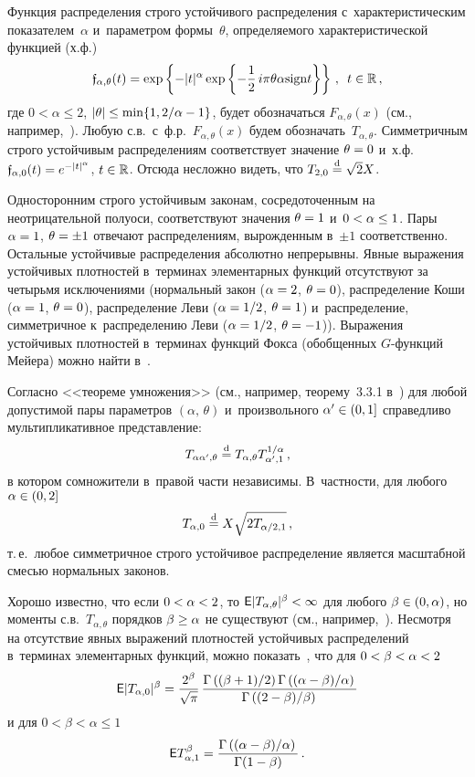 \begin{multicols}{2}
Функция распределения строго устойчивого распределения с~характеристическим
показателем~$\alpha$ и~параметром формы~$\theta$, определяемого
характеристической функцией (х.ф.)
$$
\mathfrak{f}_{\alpha,\theta}(t)=\exp
\left\{-|t|^{\alpha}\exp\left\{-\displaystyle\frac{\displaystyle 1\mathstrut}{\displaystyle 2\mathstrut}\,i\pi\theta\alpha\mathrm{sign}t\right\}\right\}\,,\enskip
t\in\mathbb{R}\,,
$$
где $0<\alpha\le2$, $|\theta|\hm\le\min\{1,{2}/{\alpha}-1\}$, будет
обозначаться $F_{\alpha,\theta}(x)$ (см., например,~\cite{Zolotarev1983}). 
Любую с.в.\ с~ф.р.\
$F_{\alpha,\theta}(x)$ будем обозначать~$T_{\alpha,\theta}$.
Симметричным строго устойчивым распределениям соответствует значение
$\theta\hm=0$ и~х.ф.~$\mathfrak{f}_{\alpha,0}(t)\hm=e^{-|t|^{\alpha}}$,
$t\hm\in\r$. Отсюда несложно видеть, что $T_{2,0}\stackrel{\mathrm{d}}{=}\sqrt{2}X$.

Односторонним строго устойчивым законам, сосредоточенным на
неотрицательной полуоси, соответствуют значения $\theta\hm=1$ 
и~$0\hm<\alpha\hm\le1$. Пары $\alpha\hm=1$, $\theta\hm=\pm1$ отвечают
распределениям, вы\-рож\-ден\-ным в~$\pm1$ соответственно. Остальные
устойчивые распределения абсолютно непрерывны. Явные выражения
устойчивых плотностей в~терминах элементарных функций отсутствуют за
четырьмя исключениями (нормальный закон ($\alpha\hm=2$, $\theta\hm=0$),
распределение Коши ($\alpha\hm=1$, $\theta\hm=0$), распределение Леви
($\alpha\hm=1/2$, $\theta\hm=1$) и~распределение, симметричное 
к~распределению Леви ($\alpha\hm=1/2$, $\theta\hm=-1$)). Выражения
устойчивых плотностей в~терминах функций Фокса (обобщенных
$G$-функ\-ций Мейера) можно найти 
в~\cite{Schneider1986, UchaikinZolotarev1999}.

Согласно <<теореме умножения>> (см., например, теорему~3.3.1 
в~\cite{Zolotarev1983}) для любой допустимой пары параметров
$(\alpha,\,\theta)$ и~произвольного $\alpha'\hm\in(0,1]$ справедливо
мультипликативное представление:
$$
T_{\alpha\alpha',\theta}\stackrel{\mathrm{d}}{=} T_{\alpha,\theta}
T_{\alpha',1}^{1/\alpha}\,,
$$
в котором сомножители в~правой части независимы. В~частности, для
любого $\alpha\hm\in(0,2]$
\begin{equation}
T_{\alpha,0}\stackrel{\mathrm{d}}{=} X\sqrt{2T_{\alpha/2,1}}\,,
\label{e1-kor}
\end{equation}
т.\,е.\ любое симметричное строго устойчивое распределение является
масштабной смесью нормальных законов.

Хорошо известно, что если $0\hm<\alpha\hm<2$, 
то ${\sf E}|T_{\alpha,\theta}|^{\beta}\hm<\infty$ для любого
$\beta\hm\in(0,\alpha)$, но моменты с.в.\ $T_{\alpha,\theta}$ порядков
$\beta\hm\ge\alpha$ не существуют (см., например,~\cite{Zolotarev1983}). 
Несмотря на отсутствие явных выражений
плотностей устойчивых распределений в~терминах элементарных функций,
можно показать~\cite{KorolevWeibull2016}, что для $0\hm<\beta\hm<\alpha\hm<2$
$$
{\sf E}|T_{\alpha,0}|^{\beta}=\displaystyle\frac{\displaystyle 2^{\beta}\mathstrut}{\displaystyle \sqrt{\pi}\mathstrut}\,
\displaystyle\frac{\displaystyle \Gamma\left(({\beta+1})/{2}\right)\Gamma\left(({\alpha-\beta})/{\alpha}\right)\mathstrut}{\displaystyle \Gamma\left(({2-\beta})/{\beta}\right)\mathstrut}
$$
и для $0<\beta<\alpha\le 1$
$$
{\sf
E}T_{\alpha,1}^{\beta}=\displaystyle\frac{\displaystyle \Gamma\left(({\alpha-\beta})/{\alpha}\right)\mathstrut}{\displaystyle \Gamma(1-\beta)\mathstrut}\,.
$$


\end{multicols}
